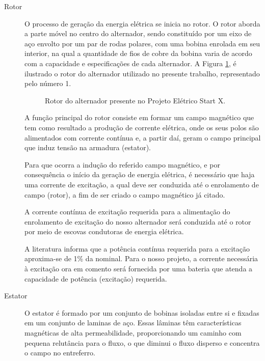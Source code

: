\begin{description}

\item [Rotor]

O processo de geração da energia elétrica se inicia no rotor. O rotor aborda a parte móvel no centro do alternador, sendo constituído por um eixo de aço envolto por um par de rodas polares, com uma bobina enrolada em seu interior, na qual a quantidade de fios de cobre da bobina varia de acordo com a capacidade e especificações de cada alternador. A Figura \ref{rotor-alternador}, é ilustrado o rotor do alternador utilizado no presente trabalho, representado pelo número 1.

\begin{figure}[h]
	\centering
	\caption{Rotor do alternador presente no Projeto Elétrico Start X.}
	\label{rotor-alternador}
\end{figure}

A função principal do rotor consiste em formar um campo magnético que tem como resultado a produção de corrente elétrica, onde os seus polos são alimentados com corrente contínua e, a partir daí, geram o campo principal que induz tensão na armadura (estator).

Para que ocorra a indução do referido campo magnético, e por consequência o início da geração de energia elétrica, é necessário que haja uma corrente de excitação, a qual deve ser conduzida até o enrolamento de campo (rotor), a fim de ser criado o campo magnético já citado. 

A corrente contínua de excitação requerida para a alimentação do enrolamento de excitação do nosso alternador será conduzida até o rotor por meio de escovas condutoras de energia elétrica. 

A literatura informa que a potência contínua requerida para a excitação aproxima-se de 1\% da nominal. Para o nosso projeto, a corrente necessária à excitação ora em comento será fornecida por uma bateria que atenda a capacidade de potência (excitação) requerida.

\item [Estator]

O estator é formado por um conjunto de bobinas isoladas entre si e fixadas em um conjunto de laminas de aço. Essas lâminas têm características magnéticas de alta permeabilidade, proporcionando um caminho com pequena relutância para o fluxo, o que diminui o fluxo disperso e concentra o campo no entreferro. 


\end{description}

